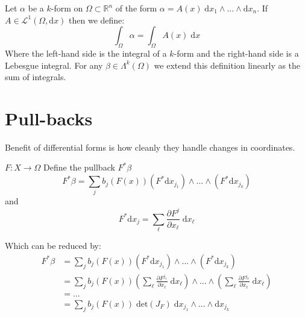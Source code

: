 \begin{definition}
Let $\alpha$ be a $k$-form on $\Omega \subset \mathbb{R}^n$ of the form $\alpha = A(x) \; \text{d}x_1 \wedge ... \wedge \text{d} x_n$.
If $A \in \mathcal{L}^1 (\Omega , \text{d}x)$ then we define:
\begin{equation}
\int_\Omega \alpha = \int_\Omega A(x) \; \text{d}x
\end{equation}
Where the left-hand side is the integral of a $k$-form and the right-hand side is a Lebesgue integral.
For any $\beta \in \Lambda^k (\Omega)$ we extend this definition linearly as the sum of integrals.
\end{definition}


\newpage
%
%

\section{Pull-backs}

Benefit of differential forms is how cleanly they handle changes in coordinates.

\begin{definition}
$F: X \to \Omega$
Define the pullback $F^* \beta$
\begin{equation}
F^* \beta = \sum_j  b_j ( F(x)) (F^* \text{d}x_{j_1}) \wedge ... \wedge (F^* \text{d} x_{j_k})
\end{equation}
and
\begin{equation}
F^* \text{d}x_j = \sum_\ell \frac{\partial F^j}{\partial x_\ell} \; \text{d} x_\ell
\end{equation}
\end{definition}

Which can be reduced by:
\begin{align}
F^ * \beta & = \sum_j  b_j ( F(x)) (F^* \text{d}x_{j_1}) \wedge ... \wedge (F^* \text{d} x_{j_k}) \\
& = \sum_j  b_j ( F(x))  
\left( \sum_\ell \frac{\partial F^{j_1}}{\partial x_\ell} \; \text{d} x_\ell \right)
\wedge ... \wedge  
\left( \sum_\ell \frac{\partial F^{j_k}}{\partial x_\ell} \; \text{d} x_\ell \right) \\
& = ... \\
& = \sum_j b_j ( F(x)) \; \text{det}\left( J_F \right) \; \text{d}x_{j_1} \wedge ... \wedge \text{d} x_{j_k}
\end{align}

